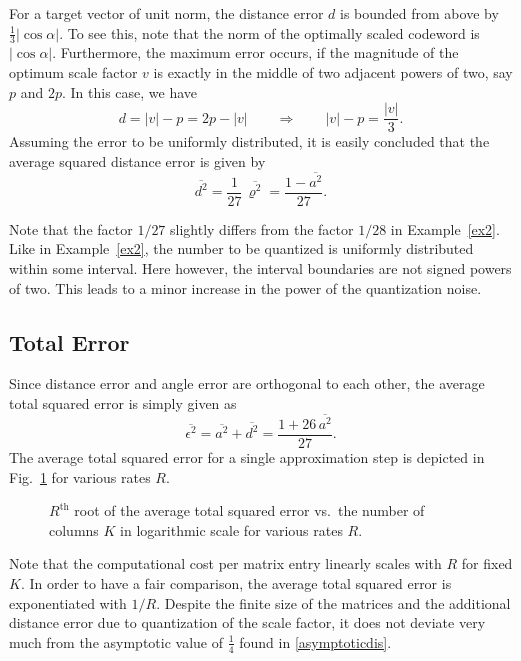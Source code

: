\documentclass[twocolumn]{IEEEtran}
\begin{document}
For a target vector of unit norm, the distance error $d$ is bounded from above by 
$\frac 13 |\cos \alpha|$.
To see this, note that the norm of the optimally scaled codeword is $|\cos \alpha|$. Furthermore, the maximum error occurs, if the magnitude of the optimum scale factor $v$ is exactly in the middle of two adjacent powers of two, say $p$ and $2p$.
In this case, we have 
\[
d= |v| -p = 2p - |v| \qquad \Rightarrow \qquad |v|-p = \frac{|v|}3.
\]
Assuming the error to be uniformly %
distributed, it is easily concluded that the average squared distance error is given by 
\begin{equation}
\overline{d^2} = \frac1{27}\, \overline{\varrho^2} = \frac{1-\overline{a^2}}{27}.
\end{equation}

Note that the factor $1/27$ slightly differs from the factor $1/28$ in Example~\ref{ex2}. Like in Example~\ref{ex2}, the number to be quantized is uniformly distributed within some interval. Here however, the interval boundaries are not signed powers of two. This leads to a minor increase in the power of the quantization noise.

\subsection{Total Error}
\label{toterr}

Since distance error and angle error are orthogonal to each other, the average total squared error is simply given as
\begin{equation}
\overline{\epsilon^2} = \overline{a^2} + \overline{d^2} = \frac{1+26 \, \overline{a^2}}{27}.
\end{equation}
The average total squared error for a single approximation step is depicted in Fig.~\ref{totalerror} for various rates $R$.
\begin{figure}
\centerline{}
\caption{$R^{\text{th}}$ root of the average total squared error vs.\ the number of columns $K$ in logarithmic scale for various rates $R$.
\label{totalerror}}
\end{figure}
Note that the computational cost per matrix entry linearly scales with $R$ for fixed $K$. In order to have a fair comparison, the average total squared error is exponentiated with $1/R$.
Despite the finite size of the matrices and the additional distance error due to quantization of the scale factor, it does not deviate very much from the asymptotic value of $\frac14$ found in \eqref{asymptoticdis}.
\end{document}

